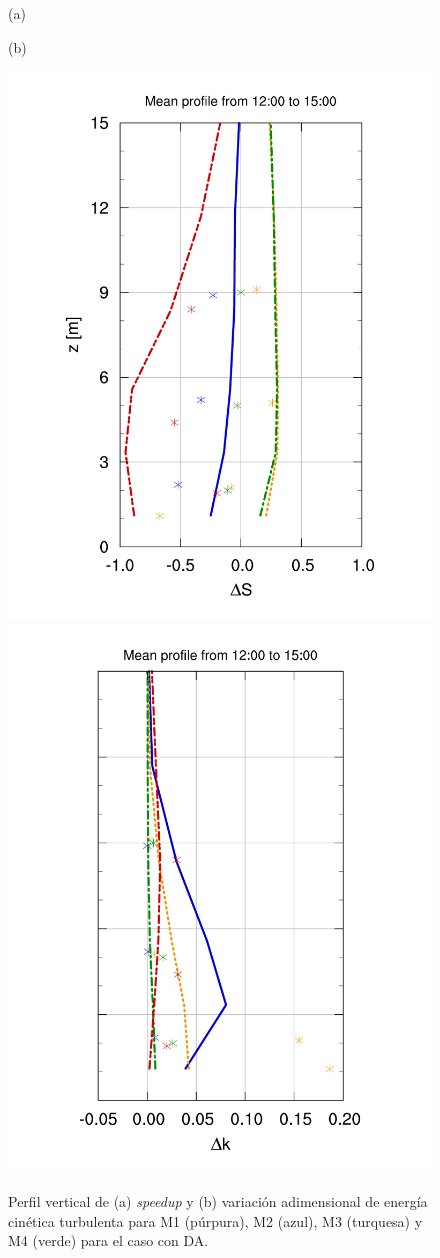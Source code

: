 \begin{figure}[H]
	\begin{minipage}{0.5\linewidth}
		\centering
		\hspace{7mm}(a)\end{minipage}%
	\begin{minipage}{0.5\linewidth}
		\centering
		\hspace{-5mm}(b)\end{minipage}%
	
	\centering
	\includegraphics[height=0.75\linewidth,page=1,trim={28mm 10mm 25mm 23mm},clip]{Imagenes/06/bol_da/V_masts}%
	\includegraphics[height=0.75\linewidth,page=1,trim={30mm 10mm 17mm 20mm},clip]{Imagenes/06/bol_da/k_masts}%
	\vspace{-2mm}\caption{Perfil vertical de (a) \emph{speedup} y (b) variación adimensional de energía cinética turbulenta para M1 (púrpura), M2 (azul), M3 (turquesa) y M4 (verde) para el caso con DA.}
	\label{fig:06_bol_da_mast_tke_speedup}
\end{figure}

